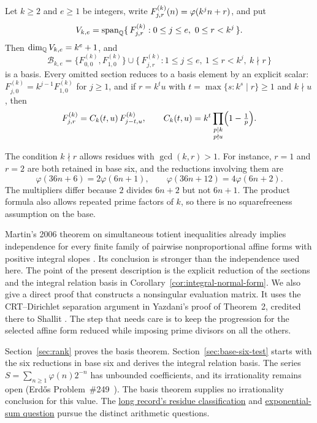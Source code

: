 \documentclass[11pt]{article}
\newcommand{\longrecord}[2]{\href{erdos249-totient-reasoning-surface.pdf\##1}{#2}}
\begin{document}
\begin{theorem}
\label{thm:kkernelrank}
Let $k\ge2$ and $e\ge1$ be integers, write $F^{(k)}_{j,r}(n)=\varphi(k^jn+r)$, and put
\[
 V_{k,e}=\operatorname{span}_{\mathbb{Q}}
 \{\,F^{(k)}_{j,r}:0\le j\le e,\ 0\le r<k^j\,\}.
\]
Then $\dim_{\mathbb{Q}}V_{k,e}=k^e+1$, and
\[
 \mathcal B_{k,e}
 =\{F^{(k)}_{0,0},F^{(k)}_{1,0}\}
 \cup\{\,F^{(k)}_{j,r}:1\le j\le e,\ 1\le r<k^j,\ k\nmid r\,\}
\]
is a basis.  Every omitted section reduces to a basis element by an explicit
scalar: $F^{(k)}_{j,0}=k^{j-1}F^{(k)}_{1,0}$ for $j\ge1$, and if $r=k^tu$ with
$t=\max\{s:k^s\mid r\}\ge1$ and $k\nmid u$, then
\[
 F^{(k)}_{j,r}=C_k(t,u)\,F^{(k)}_{j-t,u},
 \qquad
 C_k(t,u)=k^t\prod_{\substack{p\mid k\\ p\nmid u}}\Bigl(1-\tfrac1p\Bigr).
\]
\end{theorem}

The condition $k\nmid r$ allows residues with $\gcd(k,r)>1$.
For instance, $r=1$ and $r=2$ are both retained in base six, and the
reductions involving them are
\[
 \varphi(36n+6)=2\varphi(6n+1),\qquad
 \varphi(36n+12)=4\varphi(6n+2).
\]
The multipliers differ because $2$ divides $6n+2$ but not $6n+1$.
The product formula also allows repeated prime factors of $k$, so
there is no squarefreeness assumption on the base.

Martin's 2006 theorem on simultaneous totient inequalities already
implies independence for every finite family of pairwise
nonproportional affine forms with positive integral slopes
\cite[Thm.~1]{martin-phi-inequalities}. Its conclusion is stronger
than the independence used here. The point of the present description
is the explicit reduction of the sections and the integral relation
basis in Corollary~\ref{cor:integral-normal-form}.
We also give a direct proof that constructs a nonsingular evaluation
matrix. It uses the CRT--Dirichlet separation argument in Yazdani's
proof of Theorem~2, credited there to Shallit
\cite[pp.~652--653]{yazdani2001}. The step that needs care is to keep
the progression for the selected affine form reduced while imposing
prime divisors on all the others.

Section~\ref{sec:rank} proves the basis theorem.
Section~\ref{sec:base-six-test} starts with the six reductions in base
six and derives the integral relation basis. The series
$S=\sum_{n\ge1}\varphi(n)2^{-n}$ has unbounded coefficients, and its
irrationality remains open (Erd\H{o}s Problem~\#249~\cite[p.~61]{erdosgraham1980}).
The basis theorem supplies no irrationality conclusion for this value.
The \longrecord{short249-residues}{long record's residue classification}
and \longrecord{short249-first-harmonic}{exponential-sum question}
pursue the distinct arithmetic questions.
\end{document}

